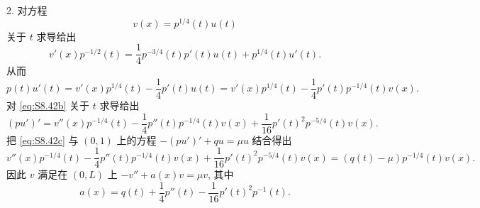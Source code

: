 2. 对方程
\begin{equation}
v(x)=p^{1/4}(t)u(t)
\tag{S1}
\label{eq:S8.42a}
\end{equation}
关于 $t$ 求导给出
\begin{equation*}
v'(x)p^{-1/2}(t)=\frac14p^{-3/4}(t)p'(t)u(t)+p^{1/4}(t)u'(t).
\end{equation*}
从而
\begin{equation}
p(t)u'(t)=v'(x)p^{1/4}(t)-\frac14p'(t)u(t)=v'(x)p^{1/4}(t)-\frac14p'(t)p^{-1/4}(t)v(x).
\tag{S2}
\label{eq:S8.42b}
\end{equation}
对 \eqref{eq:S8.42b} 关于 $t$ 求导给出
\begin{equation}
(pu')'=v''(x)p^{-1/4}(t)-\frac14p''(t)p^{-1/4}(t)v(x)+\frac{1}{16}p'(t)^2p^{-5/4}(t)v(x).
\tag{S3}
\label{eq:S8.42c}
\end{equation}
把 \eqref{eq:S8.42c} 与 $(0,1)$ 上的方程 $-(pu')'+qu=\mu u$ 结合得出
\begin{equation}
v''(x)p^{-1/4}(t)-\frac14p''(t)p^{-1/4}(t)v(x)+\frac{1}{16}p'(t)^2p^{-5/4}(t)v(x)=(q(t)-\mu)p^{-1/4}(t)v(x).
\tag{S4}
\label{eq:S8.42d}
\end{equation}
因此 $v$ 满足在 $(0,L)$ 上 $-v''+a(x)v=\mu v$, 其中
\begin{equation*}
a(x)=q(t)+\frac14p''(t)-\frac{1}{16}p'(t)^2p^{-1}(t).
\end{equation*}
